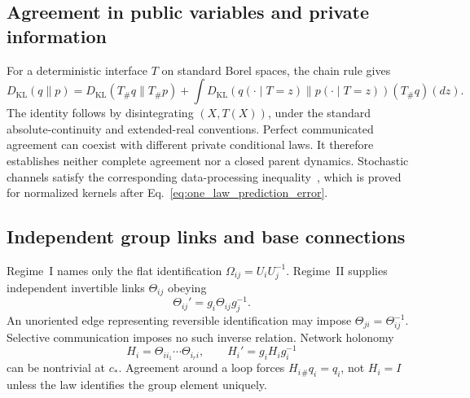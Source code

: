 \subsection{Agreement in public variables and private information}
For a deterministic interface $T$ on standard Borel spaces, the chain rule gives
\begin{equation}
D_{\mathrm{KL}}(q\|p)=D_{\mathrm{KL}}(T_\#q\|T_\#p)
+\int D_{\mathrm{KL}}(q(\cdot\mid T=z)\|p(\cdot\mid T=z))(T_\#q)(dz).
\label{eq:selective_private_information}
\end{equation}
The identity follows by disintegrating $(X,T(X))$, under the standard absolute-continuity and extended-real conventions. Perfect communicated agreement can coexist with different private conditional laws. It therefore establishes neither complete agreement nor a closed parent dynamics. Stochastic channels satisfy the corresponding data-processing inequality~\cite{CoverThomas2006}, which is proved for normalized kernels after Eq.~\eqref{eq:one_law_prediction_error}.

\subsection{Independent group links and base connections}
\label{sec:regime_convention}\label{sec:discrete_regime_ii}\label{sec:transport_hierarchy}
Regime~I names only the flat identification $\Omega_{ij}=U_iU_j^{-1}$. Regime~II supplies independent invertible links $\Theta_{ij}$ obeying
\begin{equation}
\Theta_{ij}'=g_i\Theta_{ij}g_j^{-1}.
\label{eq:omega_gauge_law}
\end{equation}
An unoriented edge representing reversible identification may impose $\Theta_{ji}=\Theta_{ij}^{-1}$. Selective communication imposes no such inverse relation. Network holonomy
\begin{equation}
H_i=\Theta_{ii_1}\cdots\Theta_{i_ri},\qquad H_i'=g_iH_i g_i^{-1}
\label{eq:discrete_holonomy}
\end{equation}
can be nontrivial at $c_*$. Agreement around a loop forces $H_i{}_\#q_i=q_i$, not $H_i=I$ unless the law identifies the group element uniquely.

